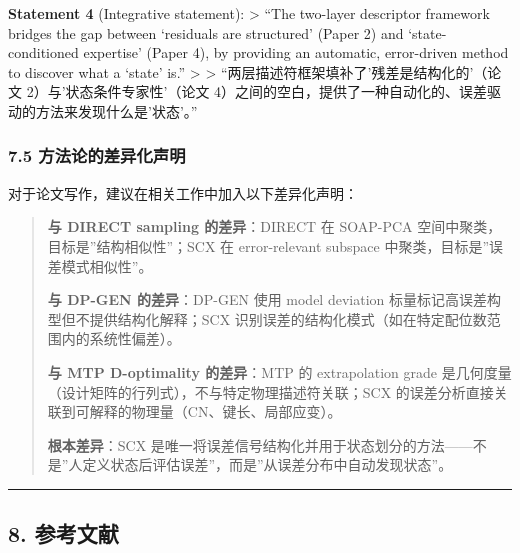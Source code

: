 \documentclass[
  12pt,
]{ctexart}
\begin{document}
\textbf{Statement 4} (Integrative statement): \textgreater{} ``The
two-layer descriptor framework bridges the gap between `residuals are
structured' (Paper 2) and `state-conditioned expertise' (Paper 4), by
providing an automatic, error-driven method to discover what a `state'
is.'' \textgreater{} \textgreater{}
``两层描述符框架填补了'残差是结构化的'（论文 2）与'状态条件专家性'（论文
4）之间的空白，提供了一种自动化的、误差驱动的方法来发现什么是'状态'。''

\subsubsection{7.5
方法论的差异化声明}\label{ux65b9ux6cd5ux8bbaux7684ux5deeux5f02ux5316ux58f0ux660e}

对于论文写作，建议在相关工作中加入以下差异化声明：

\begin{quote}
\textbf{与 DIRECT sampling 的差异}：DIRECT 在 SOAP-PCA
空间中聚类，目标是''结构相似性''；SCX 在 error-relevant subspace
中聚类，目标是''误差模式相似性''。

\textbf{与 DP-GEN 的差异}：DP-GEN 使用 model deviation
标量标记高误差构型但不提供结构化解释；SCX
识别误差的结构化模式（如在特定配位数范围内的系统性偏差）。

\textbf{与 MTP D-optimality 的差异}：MTP 的 extrapolation grade
是几何度量（设计矩阵的行列式），不与特定物理描述符关联；SCX
的误差分析直接关联到可解释的物理量（CN、键长、局部应变）。

\textbf{根本差异}：SCX
是唯一将误差信号结构化并用于状态划分的方法------不是''人定义状态后评估误差''，而是''从误差分布中自动发现状态''。
\end{quote}

\begin{center}\rule{0.5\linewidth}{0.5pt}\end{center}

\subsection{8. 参考文献}\label{ux53c2ux8003ux6587ux732e}
\end{document}
